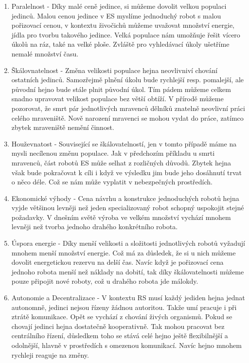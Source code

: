     \begin{enumerate}
        \item Paralelnost - Díky malé ceně jedince, si můžeme dovolit velkou populaci jedinců. Malou cenou jedince v ES myslíme jednoduchý robot s malou pořizovací cenou, v kontextu živočichů můžeme uvažovat množství energie, jídla pro tvorbu takového jedince. Velká populace nám umožňuje řešit vícero úkolů na ráz, také na velké ploše. Zvláště pro vyhledávací úkoly ušetříme nemalé množství času. 
        \item Škálovnatelnost - Změna velikosti populace hejna neovlivniví chování ostatních jedinců. Samozřejmě plnění úkolu bude rychlejší resp. pomalejší, ale původní hejno bude stále plnit původní úkol. Tím pádem můžeme celkem snadno upravovat velikost populace bez větší obtíží. V přírodě můžeme pozorovat, že smrt pár jednotlivých mravenců dělníků znatelně neovlivní práci celého mraveniště. Nově narození mravenci se mohou vydat do práce, zatímco zbytek mraveniště nemění činnost. 
        \item Houževnatost - Související se škálovatelností, jen v tomto případě máme na mysli necílenou změnu populace. Jak v předchozím příkladu u smrti mravenců, část robotů ES může selhat z rozličných důvodů. Zbytek hejna však bude pokračovat k cíli i když ve výsledku jim bude jeho dosáhnutí trvat o něco déle. Což se nám může vyplatit v nebezpečných prostředích. 
        \item Ekonomické výhody - Cena návrhu a konstrukce jednoduchých robotů hejna vyjde většinou levněji než jeden specializovaný robot schopný uspokojit stejné požadavky. V dnešním světě výroba ve velkém množství  vychází mnohem levněji než tvorba jednoho drahého konkrétního robota.
        \item Úspora energie - Díky menší velikosti a složitosti jednotlivých robotů vyžadují mnohem menší množství energie. Což má za důsledek, že si u nich můžeme dovolit energetickou rezervu na delší čas. Navíc když je pořizovací cena jednoho robota menší než náklady na dobití, tak díky škálovatelnosti můžeme pouze připojit nové roboty, což u drahého robota jde málokdy. 
        \item Autonomie a Decentralizace - V kontextu RS musí každý jediden hejna jednat autonomně, jedinci nejsou řízeny žádnou autoritou. Takže umí pracuje i při ztrátě komunikace. Opět se vychází z chování živých organismů. Pokud se chovají jedinci hejna dostatečně kooperativně. Tak mohou pracovat bez centrálního řízení, důsledkem toho se stává celé hejno ještě flexibilnější a odolnější, hlavně v prostředích s omezenou komunikací. Navíc hejno mnohem rychleji reaguje na změny. 
    \end{enumerate}
